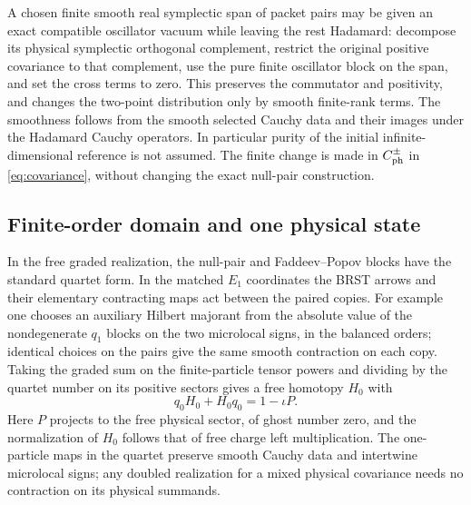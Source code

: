 A chosen finite smooth real symplectic span of packet pairs may be given an exact compatible oscillator vacuum while leaving the rest Hadamard: decompose its physical symplectic orthogonal complement, restrict the original positive covariance to that complement, use the pure finite oscillator block on the span, and set the cross terms to zero. This preserves the commutator and positivity, and changes the two-point distribution only by smooth finite-rank terms. The smoothness follows from the smooth selected Cauchy data and their images under the Hadamard Cauchy operators. In particular purity of the initial infinite-dimensional reference is not assumed. The finite change is made in \(C_{\rm ph}^\pm\) in \eqref{eq:covariance}, without changing the exact null-pair construction.

\subsection{Finite-order domain and one physical state}

In the free graded realization, the null-pair and Faddeev--Popov blocks have the standard quartet form. In the matched \(E_1\) coordinates the BRST arrows and their elementary contracting maps act between the paired copies. For example one chooses an auxiliary Hilbert majorant from the absolute value of the nondegenerate \(q_1\) blocks on the two microlocal signs, in the balanced orders; identical choices on the pairs give the same smooth contraction on each copy. Taking the graded sum on the finite-particle tensor powers and dividing by the quartet number on its positive sectors gives a free homotopy \(H_0\) with
\begin{equation}
     q_0 H_0+H_0 q_0=1-\iota P .
     \label{eq:homotopy}
\end{equation}
Here \(P\) projects to the free physical sector, of ghost number zero, and the normalization of \(H_0\) follows that of free charge left multiplication. The one-particle maps in the quartet preserve smooth Cauchy data and intertwine microlocal signs; any doubled realization for a mixed physical covariance needs no contraction on its physical summands.

